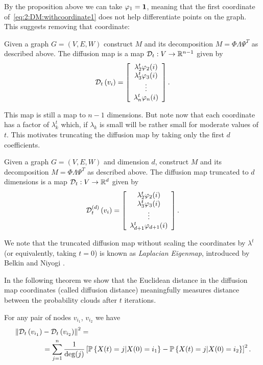 By the proposition above we can take $\varphi_1 = \mathbf{1}$, meaning that the first coordinate of~\eqref{eq:2:DM:withcoordinate1} does not help differentiate points on the graph. This suggests removing that coordinate:

\begin{definition}
Given a graph $G=(V,E,W)$ construct $M$ and its decomposition $M = \Phi \Lambda \Psi^T$ as described above. The diffusion map is a map $\mathcal{D}_t: V\to \mathbb{R}^{n-1}$ given by
\[
\mathcal{D}_t\left(v_i\right) =  \left[ \begin{array}{c} \lambda_2^t \varphi_2(i) \\ \lambda_3^t \varphi_3(i) \\ \vdots \\ \lambda_n^t \varphi_n(i) \end{array} \right].
\]
\end{definition}

This map is still a map to $n-1$ dimensions. But note now that each coordinate has a factor of $\lambda_k^t$ which, if $\lambda_k$ is small will be rather small for moderate values of $t$. This motivates truncating the diffusion map by taking only the first $d$ coefficients.

\begin{definition}
Given a graph $G=(V,E,W)$ and dimension $d$, construct $M$ and its decomposition $M = \Phi \Lambda \Psi^T$ as described above. The diffusion map truncated to $d$ dimensions is a map $\mathcal{D}_t: V\to \mathbb{R}^{d}$ given by
\[
\mathcal{D}_t^{(d)}\left(v_i\right) =  \left[ \begin{array}{c} \lambda_2^t \varphi_2(i) \\ \lambda_3^t \varphi_3(i) \\ \vdots \\ \lambda_{d+1}^t \varphi_{d+1}(i) \end{array} \right].
\]
\end{definition}

We note that the truncated diffusion map without scaling the coordinates by $\lambda^t$ (or equivalently, taking $t=0$) is known as {\em Laplacian Eigenmap}, introduced by Belkin and Niyogi \cite{belkin2001laplacian,belkin2003laplacian}. 

In the following theorem we show that the Euclidean distance in the diffusion map coordinates (called diffusion distance) meaningfully measures distance between the probability clouds after $t$ iterations.

\begin{theorem}
For any pair of nodes $v_{i_1}$, $v_{i_2}$ we have
\begin{align*}    
& \left\| \mathcal{D}_t\left(v_{i_1}\right) - \mathcal{D}_t\left(v_{i_2}\right) \right\|^2 =  \\
& \qquad \qquad
= \sum_{j=1}^n \frac{1}{\deg(j)}\left[  {\mathbb{P}}\left\{ X(t)=j | X(0) = {i_1}  \right\} - {\mathbb{P}}\left\{ X(t)=j | X(0) = {i_2}  \right\} \right]^2.
\end{align*}
\end{theorem}

